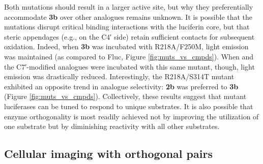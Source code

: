 Both mutations should result in a larger active site, but
why they preferentially accommodate \textbf{3b} over other analogues
remains unknown. It is possible that the mutations disrupt
critical binding interactions with the luciferin core, but that
steric appendages (e.g., on the C4′ side) retain sufficient
contacts for subsequent oxidation. Indeed, when \textbf{3b} was
incubated with R218A/F250M, light emission was maintained
(as compared to Fluc, Figure \ref{fig:muts_vs_cmpds}). When \dluciferin{} and the C7′-modified analogues were incubated with this same mutant,
though, light emission was drastically reduced. Interestingly, the
R218A/S314T mutant exhibited an opposite trend in analogue
selectivity: \textbf{2b} was preferred to \textbf{3b} (Figure \ref{fig:muts_vs_cmpds}). Collectively, these results suggest that mutant luciferases can be tuned to
respond to unique substrates. It is also possible that enzyme
orthogonality is most readily achieved not by improving the
utilization of one substrate but by diminishing reactivity with all
other substrates.

\subsection*{Cellular imaging with orthogonal pairs}

